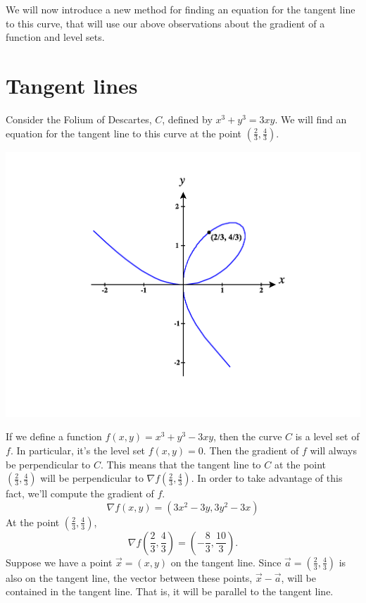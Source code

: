 \documentclass{ximera}
\begin{document}
We will now introduce a new method for finding an equation for the tangent line to this curve, that will use our above observations about the gradient of a function and level sets.

\section*{Tangent lines}

\begin{example}
Consider the Folium of Descartes, $C$, defined by $x^3+y^3=3xy$. We will find an equation for the tangent line to this curve at the point $\left(\frac{2}{3}, \frac{4}{3}\right)$.

\begin{image}
\includegraphics[width = \textwidth]{CalcPlot3D-folium_point}
\end{image}

If we define a function $f(x,y) = x^3+y^3-3xy$, then the curve $C$ is a level set of $f$. In particular, it's the level set $f(x,y)=0$. Then the gradient of $f$ will always be perpendicular to $C$. This means that the tangent line to $C$ at the point $\left(\frac{2}{3}, \frac{4}{3}\right)$ will be perpendicular to $\nabla f\left(\frac{2}{3}, \frac{4}{3}\right)$. In order to take advantage of this fact, we'll compute the gradient of $f$.
\[
\nabla f(x,y) = (3x^2-3y,3y^2-3x)
\]
At the point $\left(\frac{2}{3}, \frac{4}{3}\right)$,
\[
\nabla f\left(\frac{2}{3}, \frac{4}{3}\right) = \left(-\frac{8}{3},\frac{10}{3}\right).
\]
Suppose we have a point $\vec{x} = (x,y)$ on the tangent line. Since $\vec{a} = \left(\frac{2}{3}, \frac{4}{3}\right)$ is also on the tangent line, the vector between these points, $\vec{x}-\vec{a}$, will be contained in the tangent line. That is, it will be parallel to the tangent line.


\end{example}
\end{document}
